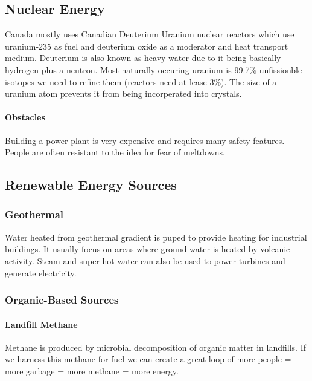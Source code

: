 \documentclass{article}
\begin{document}
\subsection{Nuclear Energy} %
\label{sub:nuclear_energy}
Canada mostly uses Canadian Deuterium Uranium nuclear reactors which use uranium-235 as fuel and deuterium oxide as a moderator and heat transport medium. Deuterium is also known as heavy water due to it being basically hydrogen plus a neutron. Most naturally occuring uranium is 99.7\% unfissionble isotopes we need to refine them (reactors need at lease 3\%). The size of a uranium atom prevents it from being incorperated into crystals.

\paragraph{Obstacles} %
\label{par:obstacles}
Building a power plant is very expensive and requires many safety features. People are often resistant to the idea for fear of meltdowns.

\subsection{Renewable Energy Sources} %
\label{sub:renewable_energy_sources}
\subsubsection{Geothermal} %
\label{sub:geothermal}
Water heated from geothermal gradient is puped to provide heating for industrial buildings. It usually focus on areas where ground water is heated by volcanic activity. Steam and super hot water can also be used to power turbines and generate electricity.

\subsubsection{Organic-Based Sources} %
\label{sub:organic_based_sources}
\paragraph{Landfill Methane} %
\label{par:landfill_methane}
Methane is produced by microbial decomposition of organic matter in landfills. If we harness this methane for fuel we can create a great loop of more people = more garbage = more methane = more energy.
\end{document}
